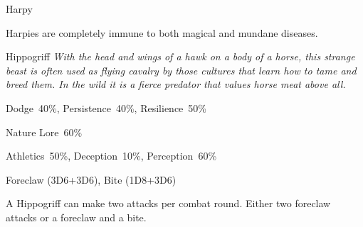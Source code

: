 \begin{monsterbox}{Harpy}
\begin{rpg-monsteraction}
	\end{rpg-monsteraction}
	\begin{rpg-monsteraction}
		Harpies are completely immune to both magical and mundane diseases.
	\end{rpg-monsteraction}

\end{monsterbox}

\newpage

\begin{monsterbox}{Hippogriff}
	\textit{With the head and wings of a hawk on a body of a horse, this strange beast is often used as flying cavalry by those cultures that learn how to tame and breed them. In the wild it is a fierce predator that values horse meat above all.}\\
	\rpghline
	\basics[%
        hitpoints  = 25,
	majorwound = 13,
	damagemodifier = +3D6,
	powerpoints = 13,
	movementrate = {23m, 37m when flying},
	armor = Hide (1AP),
	plunderrating = 0
	]
	\rpghline%
	\stats[ %
		STR = 4D6+24 (38),
		CON = 3D6+6  (17),
		DEX = 3D6+6  (17),
		SIZ = 4D6+18 (32),
		INT = 7      (7),
		POW = 2D6+6  (13),
		CHA = 5      (5)
	]
	\rpghline%
	\begin{rpg-monsteraction}[Resistances]
		Dodge~40\%, Persistence~40\%, Resilience~50\%
	\end{rpg-monsteraction}
	\begin{rpg-monsteraction}[Knowledge]
		Nature Lore~60\%
	\end{rpg-monsteraction}
	\begin{rpg-monsteraction}[Practical]
		Athletics~50\%, Deception~10\%, Perception~60\%
	\end{rpg-monsteraction}
	\begin{rpg-monsteraction}
		Foreclaw (3D6+3D6), Bite (1D8+3D6)
	\end{rpg-monsteraction}
	\begin{rpg-monsteraction}
		A Hippogriff can make two attacks per combat round. Either two foreclaw attacks or a foreclaw and a bite.
	\end{rpg-monsteraction}

\end{monsterbox}

\newpage

